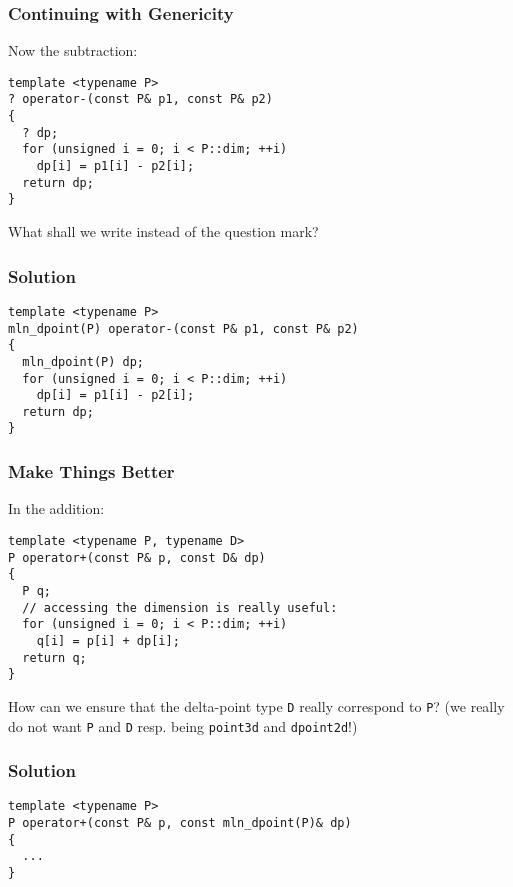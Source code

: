 \documentclass{beamer}
\newcommand{\code}[1]{{\scriptsize{\texttt{#1}}}\xspace}
\begin{document}
\begin{frame}[fragile]
  \frametitle{Continuing with Genericity}

Now the subtraction:

\begin{lstlisting}
template <typename P>
? operator-(const P& p1, const P& p2)
{
  ? dp;
  for (unsigned i = 0; i < P::dim; ++i)
    dp[i] = p1[i] - p2[i];
  return dp;
}
\end{lstlisting}

What shall we write instead of the question mark?

\end{frame}


\begin{frame}[fragile]
  \frametitle{Solution}

\begin{lstlisting}
template <typename P>
mln_dpoint(P) operator-(const P& p1, const P& p2)
{
  mln_dpoint(P) dp;
  for (unsigned i = 0; i < P::dim; ++i)
    dp[i] = p1[i] - p2[i];
  return dp;
}
\end{lstlisting}

\end{frame}


\begin{frame}[fragile]
  \frametitle{Make Things Better}

In the addition:

\begin{lstlisting}
template <typename P, typename D>
P operator+(const P& p, const D& dp)
{
  P q;
  // accessing the dimension is really useful:
  for (unsigned i = 0; i < P::dim; ++i)
    q[i] = p[i] + dp[i];
  return q;
}
\end{lstlisting}

How can we ensure that the delta-point type \code{D} really correspond
to \code{P}?  {\scriptsize (we really do not want \code{P} and
  \code{D} resp. being \code{point3d} and \code{dpoint2d}!)}

\end{frame}


\begin{frame}[fragile]
  \frametitle{Solution}

\begin{lstlisting}
template <typename P>
P operator+(const P& p, const mln_dpoint(P)& dp)
{
  ...
}
\end{lstlisting}

\end{frame}
\end{document}
